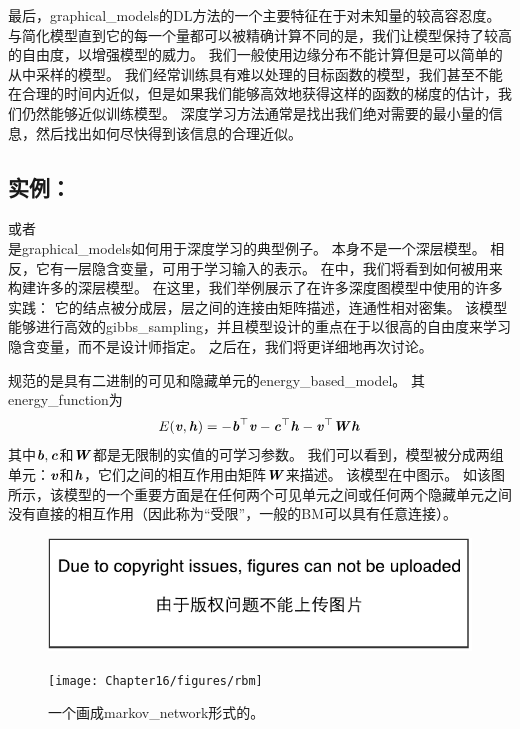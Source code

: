 最后，\gls{graphical_models}的\gls{DL}方法的一个主要特征在于对未知量的较高容忍度。
与简化模型直到它的每一个量都可以被精确计算不同的是，我们让模型保持了较高的自由度，以增强模型的威力。
我们一般使用边缘分布不能计算但是可以简单的从中采样的模型。
我们经常训练具有难以处理的目标函数的模型，我们甚至不能在合理的时间内近似，但是如果我们能够高效地获得这样的函数的梯度的估计，我们仍然能够近似训练模型。
深度学习方法通常是找出我们绝对需要的最小量的信息，然后找出如何尽快得到该信息的合理近似。



\subsection{实例：}
\label{sec:example_the_restricted_boltzmann_machine}
\citep{Smolensky86}或者\\ 是\gls{graphical_models}如何用于深度学习的典型例子。 
本身不是一个深层模型。 
相反，它有一层隐含变量，可用于学习输入的表示。 
在中，我们将看到如何被用来构建许多的深层模型。
在这里，我们举例展示了在许多深度图模型中使用的许多实践：
它的结点被分成层，层之间的连接由矩阵描述，连通性相对密集。
该模型能够进行高效的\gls{gibbs_sampling}，并且模型设计的重点在于以很高的自由度来学习隐含变量，而不是设计师指定。
之后在，我们将更详细地再次讨论。

规范的是具有二进制的可见和隐藏单元的\gls{energy_based_model}。 其\gls{energy_function}为
\begin{align}
\label{eqn:1610}
E(\boldsymbol{\mathit{v}},\boldsymbol{\mathit{h}}) = -\boldsymbol{\mathit{b}}^{\top}\boldsymbol{\mathit{v}} - \boldsymbol{\mathit{c}}^{\top}\boldsymbol{\mathit{h}} - \boldsymbol{\mathit{v}}^{\top}\boldsymbol{\mathit{W}}\boldsymbol{\mathit{h}}
\end{align}
其中$\boldsymbol{\mathit{b}},\boldsymbol{\mathit{c}}$和$\boldsymbol{\mathit{W}}$都是无限制的实值的可学习参数。
我们可以看到，模型被分成两组单元：$\boldsymbol{\mathit{v}}$和$\boldsymbol{\mathit{h}}$，它们之间的相互作用由矩阵$\boldsymbol{\mathit{W}}$来描述。
该模型在中图示。
如该图所示，该模型的一个重要方面是在任何两个可见单元之间或任何两个隐藏单元之间没有直接的相互作用（因此称为``受限''，一般的\gls{BM}可以具有任意连接）。



\begin{figure}[!htb]
\ifOpenSource
\centerline{\includegraphics{figure.pdf}}
\else
	\centerline{\texttt{[image: Chapter16/figures/rbm]}}	
\fi
	\caption{一个画成\gls{markov_network}形式的。}
	\label{fig:rbm}
\end{figure}



